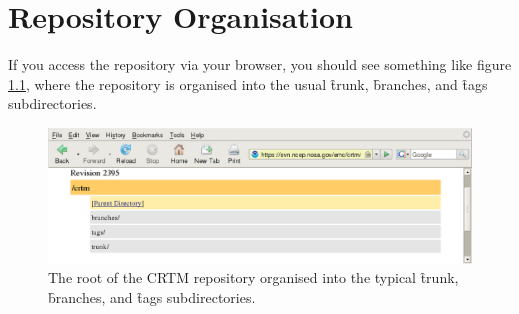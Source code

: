 \chapter{Repository Organisation}
If you access the repository via your browser, you should see something like figure \ref{fig:main_repository}, where the repository is organised into the usual \f{trunk}, \f{branches}, and \f{tags} subdirectories.
\begin{figure}[htb]
  \centering
  \includegraphics[scale=0.5]{graphics/main_repository.eps}
  \caption{The root of the CRTM repository organised into the typical \f{trunk}, \f{branches}, and \f{tags} subdirectories.}
  \label{fig:main_repository}
\end{figure}

